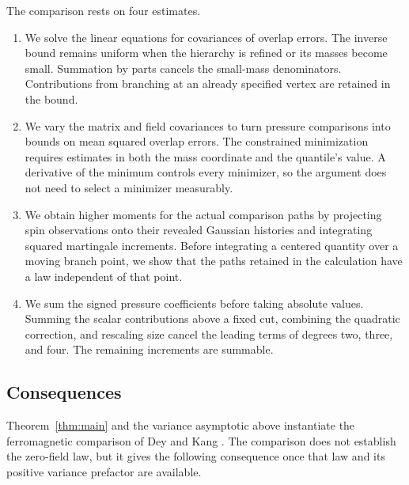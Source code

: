 The comparison rests on four estimates.
\begin{enumerate}
\item We solve the linear equations for covariances of overlap errors.
The inverse bound remains uniform when the hierarchy is refined or its
masses become small. Summation by parts cancels the small-mass
denominators. Contributions from branching at an already specified
vertex are retained in the bound.
\item We vary the matrix and field covariances to turn pressure
comparisons into bounds on mean squared overlap errors. The constrained
minimization requires estimates in both the mass coordinate and the
quantile's value. A derivative of the minimum controls every minimizer,
so the argument does not need to select a minimizer measurably.
\item We obtain higher moments for the actual comparison paths by
projecting spin observations onto their revealed Gaussian histories and
integrating squared martingale increments. Before integrating a centered
quantity over a moving branch point, we show that the paths retained in
the calculation have a law independent of that point.
\item We sum the signed pressure coefficients before taking absolute
values. Summing the scalar contributions above a fixed cut, combining
the quadratic correction, and rescaling size cancel the leading terms
of degrees two, three, and four. The remaining increments are summable.
\end{enumerate}

\subsection{Consequences}

Theorem~\ref{thm:main} and the variance asymptotic above instantiate
the ferromagnetic comparison of Dey and Kang
\cite[Proposition~1.5]{DeyKang2026}. The comparison does not establish
the zero-field law, but it gives the following consequence once that
law and its positive variance prefactor are available.

